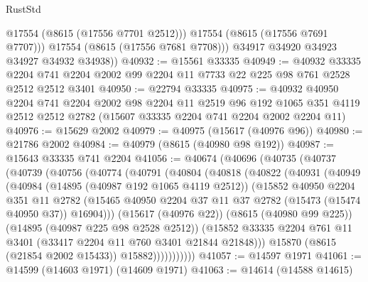 \begin{lexlean}{RustStd}
\begin{coremodule}
              @17554
              (@8615 (@17556 @7701 @2512)))
            @17554
            (@8615 (@17556 @7691 @7707)))
          @17554
          (@8615 (@17556 @7681 @7708)))
        @34917
        @34920
        @34923
        @34927
        @34932
        @34938))
@40932 := @15561 @33335
@40949 := @40932
    @33335
    @2204
    @741
    @2204
    @2002
    @99
    @2204
    @11
    @7733
    @22
    @225
    @98
    @761
    @2528
    @2512
    @2512
    @3401
@40950 := @22794 @33335
@40975 := @40932
    @40950
    @2204
    @741
    @2204
    @2002
    @98
    @2204
    @11
    @2519
    @96
    @192
    @1065
    @351
    @4119
    @2512
    @2512
    @2782
    (@15607 @33335 @2204 @741 @2204 @2002 @2204 @11)
@40976 := @15629 @2002
@40979 := @40975 (@15617 (@40976 @96))
@40980 := @21786 @2002
@40984 := @40979 (@8615 (@40980 @98 @192))
@40987 := @15643 @33335 @741 @2204
@41056 := @40674
    (@40696
      (@40735
        (@40737
          (@40739
            (@40756
              (@40774
                (@40791
                  (@40804
                    (@40818
                      (@40822
                        (@40931
                          (@40949
                            (@40984
                              (@14895 (@40987 @192 @1065 @4119 @2512))
                              (@15852
                                @40950
                                @2204
                                @351
                                @11
                                @2782
                                (@15465
                                  @40950
                                  @2204
                                  @37
                                  @11
                                  @37
                                  @2782
                                  (@15473 (@15474 @40950 @37))
                                  @16904)))
                            (@15617 (@40976 @22))
                            (@8615 (@40980 @99 @225))
                            (@14895 (@40987 @225 @98 @2528 @2512))
                            (@15852
                              @33335
                              @2204
                              @761
                              @11
                              @3401
                              (@33417 @2204 @11 @760 @3401 @21844 @21848)))
                          @15870
                          (@8615 (@21854 @2002 @15433))
                          @15882)))))))))))
@41057 := @14597 @1971
@41061 := @14599 (@14603 @1971) (@14609 @1971)
@41063 := @14614 (@14588 @14615)

\end{coremodule}
\end{lexlean}
